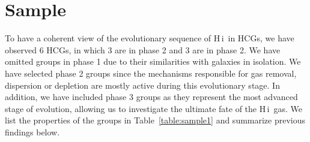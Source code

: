 \documentclass{aa}
\newcommand{\HI}{H\,{\sc i}}
\begin{document}
\section{Sample}\label{sample}
To have a coherent view of the evolutionary sequence of \HI\ in HCGs, we have observed 6 HCGs, in which 3 are in phase 2 and 3 are in phase 2. 
We have omitted groups in phase 1 due to their similarities with galaxies in isolation. We have selected phase 2 groups 
since the mechanisms responsible for gas removal, dispersion or depletion are mostly active during this evolutionary stage. In addition, we have included phase 3 groups 
as they represent the most advanced stage of evolution, allowing us to investigate the ultimate fate of the \HI\ gas. We list the properties of the groups in Table~\ref{table:sample1} and summarize previous findings below. 
\end{document}
